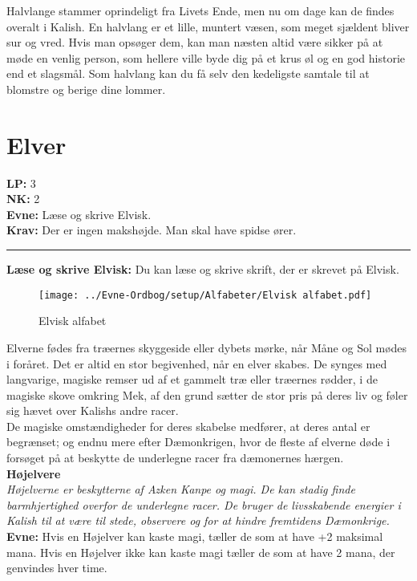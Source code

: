 Halvlange stammer oprindeligt fra Livets Ende, men nu om dage kan de findes overalt i Kalish. En halvlang er et lille, muntert væsen, som meget sjældent bliver sur og vred. Hvis man opsøger dem, kan man næsten altid være sikker på at møde en venlig person, som hellere ville byde dig på et krus øl og en god historie end et slagsmål. Som halvlang kan du få selv den kedeligste samtale til at blomstre og berige dine lommer.

\section{Elver}
\begin{race*}[Elvere]
\textbf{LP:} 3\\ 
\textbf{NK:} 2\\ 
\textbf{Evne:} Læse og skrive Elvisk.\\
\textbf{Krav:} Der er ingen makshøjde. Man skal have spidse ører.\\
\rule{\textwidth}{0.4pt}
\textbf{Læse og skrive Elvisk:} Du kan læse og skrive skrift, der er skrevet på Elvisk.\\
\end{race*}

\begin{figure}[H]
    \centering
    \texttt{[image: ../Evne-Ordbog/setup/Alfabeter/Elvisk alfabet.pdf]}
    \caption{Elvisk alfabet}
\end{figure}

Elverne fødes fra træernes skyggeside eller dybets mørke, når Måne og Sol mødes i foråret. Det er altid en stor begivenhed, når en elver skabes. De synges med langvarige, magiske remser ud af et gammelt træ eller træernes rødder, i de magiske skove omkring Mek, af den grund sætter de stor pris på deres liv og føler sig hævet over Kalishs andre racer.\\
De magiske omstændigheder for deres skabelse medfører, at deres antal er begrænset; og endnu mere efter Dæmonkrigen, hvor de fleste af elverne døde i forsøget på at beskytte de underlegne racer fra dæmonernes hærgen.\\

\textbf{Højelvere}\\
\textit{Højelverne er beskytterne af Azken Kanpe og magi. De kan stadig finde barmhjertighed overfor de underlegne racer. De bruger de livsskabende energier i Kalish til at være til stede, observere og for at hindre fremtidens Dæmonkrige.}\\
\textbf{Evne:} Hvis en Højelver kan kaste magi, tæller de som at have +2 maksimal mana. Hvis en Højelver ikke kan kaste magi tæller de som at have 2 mana, der genvindes hver time.\\

